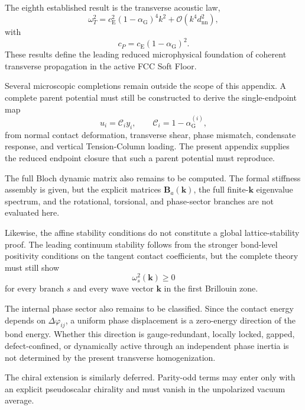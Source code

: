 The eighth established result is the transverse acoustic law,
\begin{equation}
    \omega_T^2 = c_{\mathrm{E}}^2 (1-\alpha_{\mathrm{G}})^4 k^2 + \mathcal{O}(k^4 d_{\mathrm{nn}}^2),
\end{equation}
with
\begin{equation}
    c_P = c_{\mathrm{E}}(1-\alpha_{\mathrm{G}})^2.
\end{equation}
These results define the leading reduced microphysical foundation of coherent transverse propagation in the active FCC Soft Floor.

Several microscopic completions remain outside the scope of this appendix. A complete parent potential must still be constructed to derive the single-endpoint map
\begin{equation}
    u_i = \mathcal{C}_i y_i, \qquad \mathcal{C}_i = 1-\alpha_{\mathrm{G}}^{(i)},
\end{equation}
from normal contact deformation, transverse shear, phase mismatch, condensate response, and vertical Tension-Column loading. The present appendix supplies the reduced endpoint closure that such a parent potential must reproduce.

The full Bloch dynamic matrix also remains to be computed. The formal stiffness assembly is given, but the explicit matrices $\mathbf{B}_a(\mathbf{k})$, the full finite-$\mathbf{k}$ eigenvalue spectrum, and the rotational, torsional, and phase-sector branches are not evaluated here.

Likewise, the affine stability conditions do not constitute a global lattice-stability proof. The leading continuum stability follows from the stronger bond-level positivity conditions on the tangent contact coefficients, but the complete theory must still show
\begin{equation}
    \omega_s^2(\mathbf{k}) \geq 0
\end{equation}
for every branch $s$ and every wave vector $\mathbf{k}$ in the first Brillouin zone.

The internal phase sector also remains to be classified. Since the contact energy depends on $\Delta\varphi_{ij}$, a uniform phase displacement is a zero-energy direction of the bond energy. Whether this direction is gauge-redundant, locally locked, gapped, defect-confined, or dynamically active through an independent phase inertia is not determined by the present transverse homogenization.

The chiral extension is similarly deferred. Parity-odd terms may enter only with an explicit pseudoscalar chirality and must vanish in the unpolarized vacuum average.


